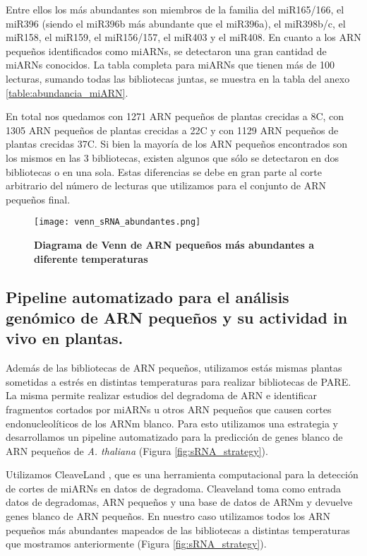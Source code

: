 Entre ellos los más abundantes son miembros de la familia del miR165/166, el miR396 (siendo el miR396b más abundante que el miR396a), el miR398b/c, el miR158, el miR159, el miR156/157, el miR403 y el miR408.
En cuanto a los ARN pequeños identificados como miARNs, se detectaron una gran cantidad de miARNs conocidos.
La tabla completa para miARNs que tienen más de 100 lecturas, sumando todas las bibliotecas juntas, se muestra en la tabla del anexo \ref{table:abundancia_miARN}.

En total nos quedamos con 1271 ARN pequeños de plantas crecidas a 8\degree C, con 1305 ARN pequeños de plantas crecidas a 22\degree C y con 1129 ARN pequeños de plantas crecidas 37\degree C.
Si bien la mayoría de los ARN pequeños encontrados son los mismos en las 3 bibliotecas, existen algunos que sólo se detectaron en dos bibliotecas o en una sola.
Estas diferencias se debe en gran parte al corte arbitrario del número de lecturas que utilizamos para el conjunto de ARN pequeños final.
 
\begin{figure}[htbp!] 
    \centering    
    \texttt{[image: venn\_sRNA\_abundantes.png]}
    \caption[Diagrama de Venn de ARN pequeños más abundantes a diferente temperaturas]{
    \textbf{Diagrama de Venn de ARN pequeños más abundantes a diferente temperaturas}
    }
        
     \label{fig:venn_sRNA_abundantes}
\end{figure}

\subsection{Pipeline automatizado para el análisis genómico de ARN pequeños y su actividad in vivo en plantas.}

Además de las bibliotecas de ARN pequeños, utilizamos estás mismas plantas sometidas a estrés en distintas temperaturas para realizar bibliotecas de PARE\citep{pmid19247285}.
La misma permite realizar estudios del degradoma de ARN e identificar fragmentos cortados por miARNs u otros ARN pequeños que causen cortes endonucleolíticos de los ARNm blanco.
Para esto utilizamos una estrategia y desarrollamos un pipeline automatizado para la predicción de genes blanco de ARN pequeños de \textit{A. thaliana} (Figura \ref{fig:sRNA_strategy}).

Utilizamos CleaveLand \citep{pmid19017659}, que es una herramienta computacional para la detección de cortes de miARNs en datos de degradoma.
Cleaveland toma como entrada datos de degradomas, ARN pequeños y una base de datos de ARNm y devuelve genes blanco de ARN pequeños.
En nuestro caso utilizamos todos los ARN pequeños más abundantes mapeados de las bibliotecas a distintas temperaturas que mostramos anteriormente (Figura \ref{fig:sRNA_strategy}).

